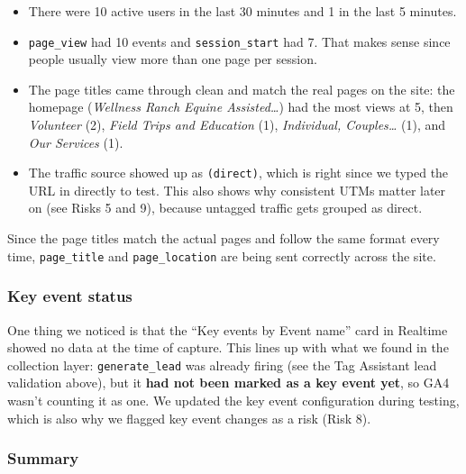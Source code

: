 \documentclass[
  letterpaper,
  DIV=11,
  numbers=noendperiod]{scrartcl}
\providecommand{\tightlist}{%
  \setlength{\itemsep}{0pt}\setlength{\parskip}{0pt}}
\begin{document}
\begin{itemize}
\tightlist
\item
  There were 10 active users in the last 30 minutes and 1 in the last 5
  minutes.
\item
  \texttt{page\_view} had 10 events and \texttt{session\_start} had 7.
  That makes sense since people usually view more than one page per
  session.
\item
  The page titles came through clean and match the real pages on the
  site: the homepage (\emph{Wellness Ranch Equine Assisted\ldots{}}) had
  the most views at 5, then \emph{Volunteer} (2), \emph{Field Trips and
  Education} (1), \emph{Individual, Couples\ldots{}} (1), and \emph{Our
  Services} (1).
\item
  The traffic source showed up as \texttt{(direct)}, which is right
  since we typed the URL in directly to test. This also shows why
  consistent UTMs matter later on (see Risks 5 and 9), because untagged
  traffic gets grouped as direct.
\end{itemize}

Since the page titles match the actual pages and follow the same format
every time, \texttt{page\_title} and \texttt{page\_location} are being
sent correctly across the site.

\subsubsection{Key event status}\label{key-event-status}

One thing we noticed is that the ``Key events by Event name'' card in
Realtime showed no data at the time of capture. This lines up with what
we found in the collection layer: \texttt{generate\_lead} was already
firing (see the Tag Assistant lead validation above), but it \textbf{had
not been marked as a key event yet}, so GA4 wasn't counting it as one.
We updated the key event configuration during testing, which is also why
we flagged key event changes as a risk (Risk 8).

\subsubsection{Summary}\label{summary}
\end{document}
